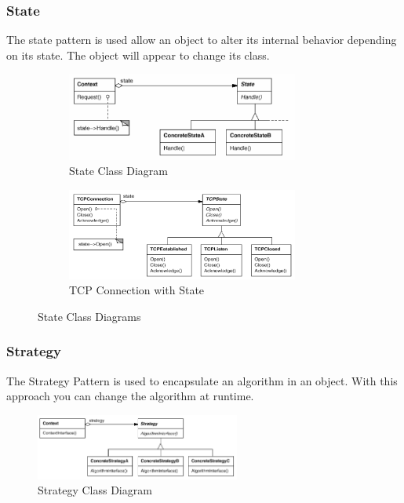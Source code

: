 \documentclass[11pt]{article}
\begin{document}
\subsubsection{State}
\label{sec:org3e4b033}

The state pattern is used allow an object to alter its internal behavior depending on its state.
The object will appear to change its class.

\begin{figure}[h]
  \centering
  \begin{subfigure}{0.4\textwidth}
    \centering
    \includegraphics[width=3in]{img/state.png}
    \caption{State Class Diagram \label{fig:state-class-diagram}}
  \end{subfigure}
  \hfill
  \begin{subfigure}{0.4\textwidth}
    \centering
    \includegraphics[width=3in]{img/state_example.png}
    \caption{TCP Connection with State \label{fig:tcp-connection-with-state}}
  \end{subfigure}
  \caption{
    \label{fig:state-class-diagrams}
    State Class Diagrams
  }
\end{figure}

\subsubsection{Strategy}
\label{sec:orge14805c}

The Strategy Pattern is used to encapsulate an algorithm in an object.
With this approach you can change the algorithm at runtime.

\begin{figure}[htbp]
\centering
\includegraphics[width=0.6\textwidth]{img/strategy.png}
\caption{\label{fig:strategy-class-diagram}Strategy Class Diagram}
\end{figure}
\end{document}
